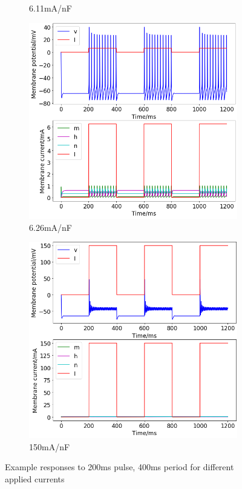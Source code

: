 \documentclass[twoside,twocolumn]{article}
\begin{document}
\begin{figure}[h]
\begin{subfigure}[t]{0.49\textwidth}
  \caption{6.11mA/nF}
  \label{sub:2a6-11}
  \end{subfigure}
\newline
\begin{subfigure}[t]{0.49\textwidth}
    \includegraphics[width=\linewidth]{a6-26}
  \caption{6.26mA/nF}
  \label{sub:2a6-26}
  \end{subfigure}
  \begin{subfigure}[t]{0.49\textwidth}
    \includegraphics[width=\linewidth]{a150}
  \caption{150mA/nF}
  \label{sub:2a150}
  \end{subfigure}
  \caption{Example responses to 200ms pulse, 400ms period for different applied currents}
  \label{fig:2ae}
\end{figure}
\end{document}
